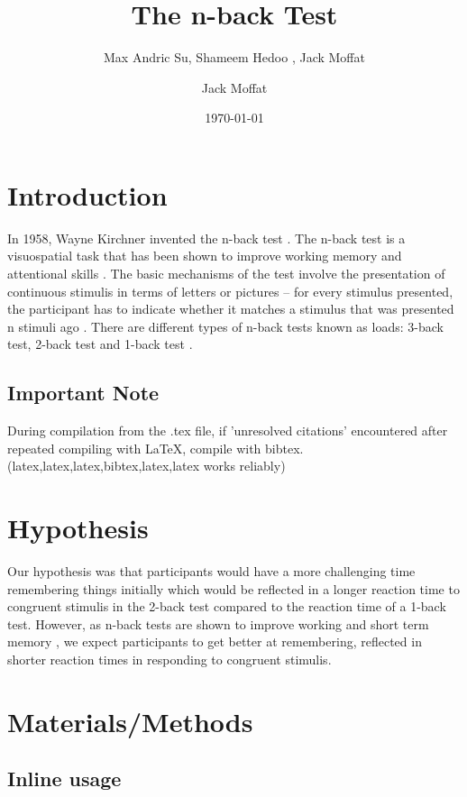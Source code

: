 \documentclass{article}
\author{Max Andric Su, Shameem Hedoo , Jack Moffat}
\author{Jack Moffat}
\date{\today}
\title{The n-back Test}
\begin{document}
\maketitle
\tableofcontents


\section{Introduction}
\label{sec:org5c96cef}

In 1958, Wayne Kirchner invented the n-back test \cite{COULACOGLOU201791}. The n-back test is a visuospatial task that has been shown to improve working memory and attentional skills \cite{COLOM2013712}. The basic mechanisms of the test involve the presentation of continuous stimulis in terms of letters or pictures – for every stimulus presented, the participant has to indicate whether it matches a stimulus that was presented n stimuli ago \cite{Kane}. There are different types of n-back tests known as loads: 3-back test, 2-back test and 1-back test \cite{Forns}.

\subsection{Important Note}
\label{sec:org4f05c74}
During compilation from the .tex file, if 'unresolved citations' encountered after repeated compiling with \LaTeX{}, compile with bibtex.
(latex,latex,latex,bibtex,latex,latex works reliably)
\section{Hypothesis}
\label{sec:org7fd8c26}

Our hypothesis was that participants would have a more challenging time remembering things initially which would be reflected in a longer reaction time to congruent stimulis in the 2-back test compared to the reaction time of a 1-back test. However, as n-back tests are shown to improve working and short term memory \cite{LEONDOMINGUEZ2015167}, we expect participants to get better at remembering, reflected in shorter reaction times in responding to congruent stimulis.

\section{Materials/Methods}
\label{sec:orgcfe3467}

\subsection{Inline usage}
\label{sec:org4bd68db}
\end{document}
